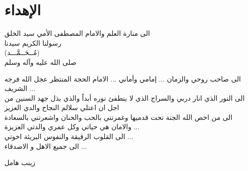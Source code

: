 \chapter*{الإهداء}

\begin{center}
	الى منارة العلم والامام المصطفى الأمي سيد الخلق \\
	رسولنا الكريم سيدنا\\
	(مُــحَــمَّـــد)\\
	صلى الله عليه وآله وسلم
\end{center}

\noindent
الى صاحب روحي والزمان ... إمامي وأماني ... الامام الحجة المنتظر عجل الله فرجه الشريف ...\\[10pt]
الى النور الذي انار دربي والسراج الذي لا ينطفئ نوره أبداً والذي بذل جهد السنين من اجل ان اعتلي سلالم النجاح والدي العزيز\\[10pt]
الى من اخص الله الجنة تحت قدميها وغمرتني بالحب والحنان واشعرتني بالسعادة والامان هي حياتي وكل عمري والدتي العزيزة ...\\[10pt]
الى القلوب الرقيقة والنفوس البريئة اخوتي ...\\[10pt]
الى جميع الاهل و الاصدقاء ...
\begin{flushleft}
	زينب هامل
\end{flushleft}